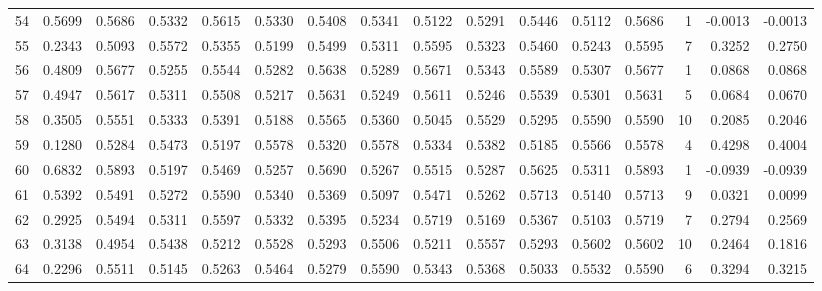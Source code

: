 \begin{tabular}{lrrrrrrrrrrrrrrr}
54  &      0.5699 &  0.5686 &  0.5332 &  0.5615 &  0.5330 &  0.5408 &  0.5341 &  0.5122 &  0.5291 &  0.5446 &   0.5112 &     0.5686 &      1 &                   -0.0013 &                    -0.0013 \\
55  &      0.2343 &  0.5093 &  0.5572 &  0.5355 &  0.5199 &  0.5499 &  0.5311 &  0.5595 &  0.5323 &  0.5460 &   0.5243 &     0.5595 &      7 &                    0.3252 &                     0.2750 \\
56  &      0.4809 &  0.5677 &  0.5255 &  0.5544 &  0.5282 &  0.5638 &  0.5289 &  0.5671 &  0.5343 &  0.5589 &   0.5307 &     0.5677 &      1 &                    0.0868 &                     0.0868 \\
57  &      0.4947 &  0.5617 &  0.5311 &  0.5508 &  0.5217 &  0.5631 &  0.5249 &  0.5611 &  0.5246 &  0.5539 &   0.5301 &     0.5631 &      5 &                    0.0684 &                     0.0670 \\
58  &      0.3505 &  0.5551 &  0.5333 &  0.5391 &  0.5188 &  0.5565 &  0.5360 &  0.5045 &  0.5529 &  0.5295 &   0.5590 &     0.5590 &     10 &                    0.2085 &                     0.2046 \\
59  &      0.1280 &  0.5284 &  0.5473 &  0.5197 &  0.5578 &  0.5320 &  0.5578 &  0.5334 &  0.5382 &  0.5185 &   0.5566 &     0.5578 &      4 &                    0.4298 &                     0.4004 \\
60  &      0.6832 &  0.5893 &  0.5197 &  0.5469 &  0.5257 &  0.5690 &  0.5267 &  0.5515 &  0.5287 &  0.5625 &   0.5311 &     0.5893 &      1 &                   -0.0939 &                    -0.0939 \\
61  &      0.5392 &  0.5491 &  0.5272 &  0.5590 &  0.5340 &  0.5369 &  0.5097 &  0.5471 &  0.5262 &  0.5713 &   0.5140 &     0.5713 &      9 &                    0.0321 &                     0.0099 \\
62  &      0.2925 &  0.5494 &  0.5311 &  0.5597 &  0.5332 &  0.5395 &  0.5234 &  0.5719 &  0.5169 &  0.5367 &   0.5103 &     0.5719 &      7 &                    0.2794 &                     0.2569 \\
63  &      0.3138 &  0.4954 &  0.5438 &  0.5212 &  0.5528 &  0.5293 &  0.5506 &  0.5211 &  0.5557 &  0.5293 &   0.5602 &     0.5602 &     10 &                    0.2464 &                     0.1816 \\
64  &      0.2296 &  0.5511 &  0.5145 &  0.5263 &  0.5464 &  0.5279 &  0.5590 &  0.5343 &  0.5368 &  0.5033 &   0.5532 &     0.5590 &      6 &                    0.3294 &                     0.3215 \\

\end{tabular}
